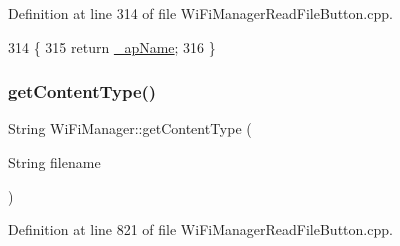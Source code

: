 Definition at line 314 of file Wi\+Fi\+Manager\+Read\+File\+Button.\+cpp.


\begin{DoxyCode}
314                                         \{
315   \textcolor{keywordflow}{return} \hyperlink{class_wi_fi_manager_a2c27e2f375122254cde4b2fd9ed1e117}{\_apName};
316 \}
\end{DoxyCode}
\mbox{\label{class_wi_fi_manager_a40f123fd290c3e331c9785d19a88f3b8}} 
\subsubsection{\texorpdfstring{get\+Content\+Type()}{getContentType()}}
{\footnotesize\ttfamily String Wi\+Fi\+Manager\+::get\+Content\+Type (\begin{DoxyParamCaption}\item[{String}]{filename }\end{DoxyParamCaption})\hspace{0.3cm}{\ttfamily [private]}}



Definition at line 821 of file Wi\+Fi\+Manager\+Read\+File\+Button.\+cpp.


